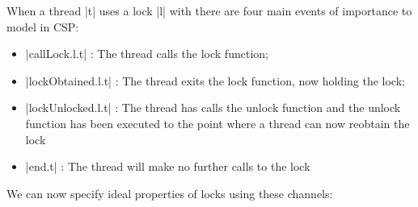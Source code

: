 When a thread |t| uses a lock |l| with there are four main events of importance to model in CSP:

\begin{itemize}
  \item |callLock.l.t| : The thread calls the lock function;
  \item |lockObtained.l.t| : The thread exits the lock function, now holding the lock;
  \item |lockUnlocked.l.t| : The thread has calls the unlock function and the unlock function has been executed to the point where a thread can now reobtain the lock
  \item |end.t| : The thread will make no further calls to the lock 
  
\end{itemize}

We can now specify ideal properties of locks using these channels:

